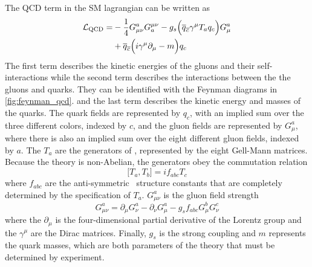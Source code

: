 The QCD term in the SM lagrangian can be written as
\begin{equation}
\begin{aligned}
\mathcal{L}_{\textrm{QCD}} = &-\frac{1}{4}G^a_{\mu\nu} G_a^{\mu\nu} 
                         -g_s \Big( \overline{q}_{\overline{c}} \gamma^{\mu} T_a q_{c} \Big) G_{\mu}^a \\
			 &+\overline{q}_{\overline{c}}\Big( i\gamma^{\mu} \partial_{\mu} - m\Big) q_c
\end{aligned}
\label{eq:lagrangian_qcd}
\end{equation}
The first term describes the kinetic energies of the gluons
and their self-interactions while the second term describes the 
interactions between the the gluons and
quarks.
They can be identified with the Feynman diagrams in
\fig\ref{fig:feynman_qcd}. 
and the last term describes the
kinetic energy and masses of the quarks.
The quark fields are represented by $q_c$, with an implied sum over the
three different colors, indexed by $c$, and the gluon fields are represented
by $G_{\mu}^a$, where there is also an implied sum over the eight
different gluon fields, indexed by $a$. The 
$T_a$ are the generators of \suthree, represented by the eight Gell-Mann matrices.
Because the theory is non-Abelian, the generators obey the commutation relation
\begin{equation}
\Big[T_a,T_b\Big] = i f_{abc} T_c
\end{equation}
where $f_{abc}$ are the anti-symmetric
\suthree~structure constants that are completely determined
by the specification of $T_a$.
$G_{\mu\nu}^a$ is the gluon field strength
\begin{equation}
G_{\mu\nu}^a = \partial_{\mu} G^a_{\nu} - \partial_{\nu} G^a_{\mu} - g_s f_{abc} G_{\mu}^b G_{\nu}^c
\end{equation}
where the $\partial_{\mu}$ is the four-dimensional partial derivative 
of the Lorentz
group and the $\gamma^{\mu}$ are the Dirac matrices.
Finally, $g_s$ is the strong coupling and $m$ represents
the quark masses, which are both parameters of the theory that must
be determined by experiment.


